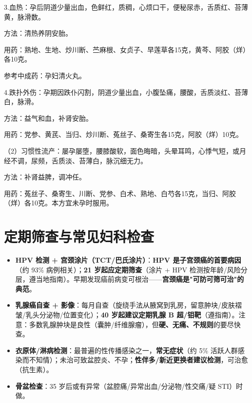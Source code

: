 \documentclass[12pt,UTF8,openany]{ctexbook}
\begin{document}
3.血热：孕后阴道少量出血，色鲜红，质稠，心烦口干，便秘尿赤，舌质红、苔薄黄，脉滑数。

方法：清热养阴安胎。

用药：熟地、生地、炒川断、苎麻根、女贞子、早莲草各15克，黄芩、阿胶（烊）各10克。

参考中成药：孕妇清火丸。

4.跌扑外伤：孕期因跌仆闪割，阴道少量出血，小腹坠痛，腰酸，舌质淡红、苔薄白，脉滑。

方法：益气和血，补肾安胎。

用药：党参、黄芪、当归、炒川断、菟丝子、桑寄生各15克，阿胶（烊）10克。

（2）习惯性流产：屡孕屡堕，腰膝酸软，面色晦暗，头晕耳鸣，心悸气短，或月经不调，尿频，舌质淡、苔薄白，脉沉细无力。

方法：补肾益脾，调冲任。

用药：菟丝子、桑寄生、川断、党参、白术、熟地、白芍各15克，当归、阿胶（烊）各10克。本方宜未孕时服用。

\section{定期筛查与常见妇科检查}

\begin{itemize}[leftmargin=2em,itemsep=0.3em]
  \item \textbf{HPV 检测 + 宫颈涂片（TCT/巴氏涂片）}：\textbf{HPV 是子宫颈癌的首要病因}（约 93\% 病例相关）；\textbf{21 岁起应定期筛查}（涂片 + HPV 检测按年龄/风险分层，遵当地指南）。早期发现癌前病变可根治——\textbf{宫颈癌是"可防可筛可治"的典范}。
  \item \textbf{乳腺癌自查 + 影像}：每月自查（旋绕手法从腋窝到乳房，留意肿块/皮肤褶皱/乳头分泌物/位置变化）；\textbf{40 岁起建议定期乳腺 B 超/钼靶}（遵指南）。注意：多数乳腺肿块是良性（囊肿/纤维腺瘤），但\textbf{硬、无痛、不规则}的要尽快查。
  \item \textbf{衣原体/淋病检测}：最普遍的性传播感染之一，\textbf{常无症状}（约 5\% 活跃人群感染而不知情）；未治可致盆腔炎、不孕；\textbf{性伴多/新近更换者建议检测}，可治愈（抗生素）。
  \item \textbf{骨盆检查}：35 岁后或有异常（盆腔痛/异常出血/分泌物/性交痛/疑 STI）时做。
\end{itemize}
\end{document}
